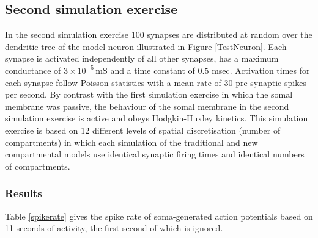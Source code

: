 \subsection{Second simulation exercise}\label{sim2}

In the second simulation exercise 100 synapses are distributed at
random over the dendritic tree of the model neuron illustrated in
Figure \ref{TestNeuron}. Each synapse is activated independently
of all other synapses, has a maximum conductance of
$3\times10^{-5}\,\mbox{mS}$ and a time constant of $0.5$ msec.
Activation times for each synapse follow Poisson statistics with a
mean rate of 30 pre-synaptic spikes per second. By contrast with
the first simulation exercise in which the somal membrane was
passive, the behaviour of the somal membrane in the second
simulation exercise is active and obeys Hodgkin-Huxley kinetics.
This simulation exercise is based on 12 different levels of
spatial discretisation (number of compartments) in which each
simulation of the traditional and new compartmental models use
identical synaptic firing times and identical numbers of
compartments.

\subsubsection{Results}
Table \ref{spikerate} gives the spike rate of soma-generated
action potentials based on 11 seconds of activity, the first
second of which is ignored.

